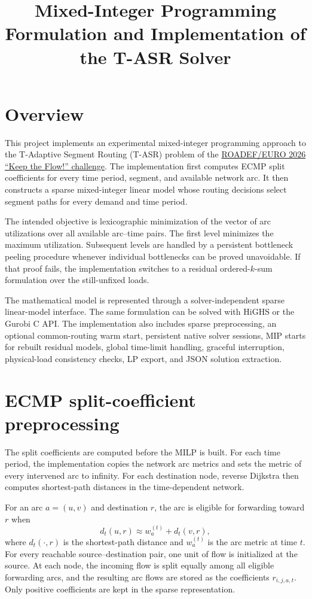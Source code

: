 \documentclass[11pt,a4paper]{article}
\title{Mixed-Integer Programming Formulation and Implementation of the T-ASR Solver}
\author{}
\date{}
\begin{document}
\maketitle

\tableofcontents
\newpage

\section{Overview}

This project implements an experimental mixed-integer programming approach to
 the T-Adaptive Segment Routing (T-ASR) problem of the
\href{https://roadef.org/challenge/2026/en/index.php}{ROADEF/EURO 2026 ``Keep the Flow!'' challenge}.
The implementation first computes ECMP split coefficients for every time period,
segment, and available network arc. It then constructs a sparse mixed-integer
linear model whose routing decisions select segment paths for every demand and
time period.

The intended objective is lexicographic minimization of the vector of arc
utilizations over all available arc--time pairs. The first level minimizes the
maximum utilization. Subsequent levels are handled by a persistent bottleneck
peeling procedure whenever individual bottlenecks can be proved unavoidable.
If that proof fails, the implementation switches to a residual ordered-$k$-sum
formulation over the still-unfixed loads.

The mathematical model is represented through a solver-independent sparse
linear-model interface. The same formulation can be solved with HiGHS or the
Gurobi C API. The implementation also includes sparse preprocessing, an
optional common-routing warm start, persistent native solver sessions, MIP
starts for rebuilt residual models, global time-limit handling, graceful
interruption, physical-load consistency checks, LP export, and JSON solution
extraction.

\section{ECMP split-coefficient preprocessing}

The split coefficients are computed before the MILP is built. For each time
period, the implementation copies the network arc metrics and sets the metric
of every intervened arc to infinity. For each destination node, reverse Dijkstra
then computes shortest-path distances in the time-dependent network.

For an arc $a=(u,v)$ and destination $r$, the arc is eligible for forwarding
toward $r$ when
\[
d_t(u,r)\approx w_a^{(t)}+d_t(v,r),
\]
where $d_t(\cdot,r)$ is the shortest-path distance and $w_a^{(t)}$ is the
arc metric at time $t$. For every reachable source--destination pair, one unit
of flow is initialized at the source. At each node, the incoming flow is split
equally among all eligible forwarding arcs, and the resulting arc flows are
stored as the coefficients $r_{i,j,a,t}$. Only positive coefficients are kept
in the sparse representation.
\end{document}

